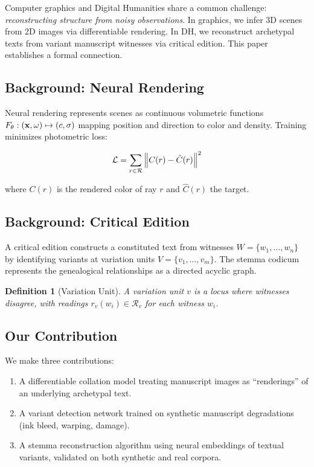 \documentclass[12pt,a4paper]{article}
\newtheorem{definition}[theorem]{Definition}
\begin{document}
Computer graphics and Digital Humanities share a common challenge:
\emph{reconstructing structure from noisy observations}. In graphics,
we infer 3D scenes from 2D images via differentiable rendering. In DH,
we reconstruct archetypal texts from variant manuscript witnesses
via critical edition. This paper establishes a formal connection.

\ifdhformat
{}
\else
\fi

\subsection{Background: Neural Rendering}
\label{sec:bg-rendering}

Neural rendering \parencite{mildenhall2021nerf,tewari2022advances} represents
scenes as continuous volumetric functions $F_\theta: (\vb{x}, \omega) \mapsto (c, \sigma)$
mapping position and direction to color and density. Training minimizes
photometric loss:

\begin{equation}\label{eq:nerf-loss}
\mathcal{L} = \sum_{r \in \mathcal{R}} \norm{C(r) - \hat{C}(r)}^2
\end{equation}

where $C(r)$ is the rendered color of ray $r$ and $\hat{C}(r)$ the target.

\subsection{Background: Critical Edition}
\label{sec:bg-edition}

A critical edition constructs a constituted text from witnesses
$W = \{w_1, \dots, w_n\}$ by identifying variants at variation units
$V = \{v_1, \dots, v_m\}$. The stemma codicum represents the
genealogical relationships as a directed acyclic graph.

\begin{definition}[Variation Unit]\label{def:varunit}
A variation unit $v$ is a locus where witnesses disagree,
with readings $r_v(w_i) \in \mathcal{R}_v$ for each witness $w_i$.
\end{definition}

\subsection{Our Contribution}
\label{sec:contrib}

We make three contributions:
\begin{enumerate}
    \item A differentiable collation model treating manuscript images
          as ``renderings'' of an underlying archetypal text.
    \item A variant detection network trained on synthetic manuscript
          degradations (ink bleed, warping, damage).
    \item A stemma reconstruction algorithm using neural embeddings
          of textual variants, validated on both synthetic and real corpora.
\end{enumerate}
\end{document}
